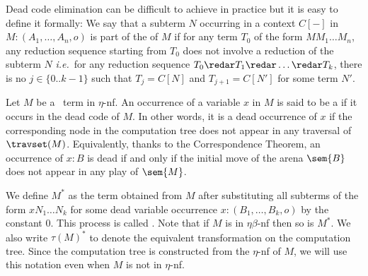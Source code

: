 Dead code elimination can be difficult to achieve in practice but it
is easy to define it formally: We say that a subterm $N$ occurring
in a context $C[-]$ in $M : (A_1, \ldots, A_n,o)$ is part of the
 of $M$ if for any term $T_0$ of the form $M M_1
\ldots M_n$, any reduction sequence starting from $T_0$ does not
involve a reduction of the subterm $N$ {\it i.e.}~for any reduction
sequence $T_0 \redar T_1 \redar \ldots \redar T_k$, there is no
$j\in \{0.. k-1\}$ such that $T_j = C[N]$ and $T_{j+1} = C[N']$ for
some term $N'$.


Let $M$  be a \pcf\ term in $\eta$-nf. An occurrence of a variable
$x$ in $M$ is said to be a  if it occurs in
the dead code of $M$. In other words, it is a dead occurrence of $x$
if the corresponding node in the computation tree does not appear in
any traversal of $\travset(M)$. Equivalently, thanks to the
Correspondence Theorem, an occurrence of $x:B$ is dead if and only
if the initial move of the arena $\sem{B}$ does not appear in any
play of $\sem{M}$.


We define $M^*$ as the term obtained from $M$ after substituting all
subterms of the form  $x N_1 \dots N_k$ for some dead variable
occurrence $x:(B_1,\ldots, B_k, o)$ by the constant $0$. This
process is called . Note that if
$M$ is in $\eta\beta$-nf then so is $M^*$. We also write $\tau(M)^*$
to denote the equivalent transformation on the computation tree.
Since the computation tree is constructed from the $\eta$-nf of $M$,
we will use this notation even when $M$ is not in $\eta$-nf.



